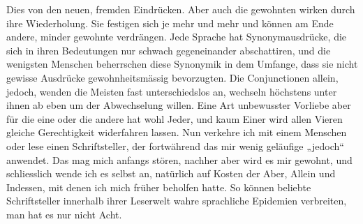 {Dies von den neuen, fremden Eindrücken. Aber auch die gewohnten wirken durch ihre Wiederholung. Sie festigen sich je mehr und mehr und können am Ende andere, minder gewohnte verdrängen. Jede Sprache hat Synonymausdrücke, die sich in ihren Bedeutungen nur schwach gegeneinander abschattiren, und die wenigsten Menschen beherrschen diese Synonymik in dem Umfange, dass sie nicht gewisse Ausdrücke gewohnheitsmässig bevorzugten. Die Conjunctionen  allein, jedoch,  wenden die Meisten fast unterschiedslos an, wechseln höchstens unter ihnen ab eben um der Abwechselung willen. Eine Art unbewusster Vorliebe aber für die eine oder die andere hat wohl Jeder, und kaum Einer wird allen Vieren gleiche Gerechtigkeit widerfahren lassen. Nun verkehre ich mit einem Menschen oder lese einen Schriftsteller, der fortwährend das mir wenig geläufige „jedoch“ anwendet. Das mag mich anfangs stören, nachher aber wird es mir gewohnt, und schliesslich wende ich es selbst an, natürlich auf Kosten der Aber, Allein und Indessen, mit denen ich mich früher beholfen hatte. So können beliebte Schriftsteller innerhalb ihrer Leserwelt wahre sprachliche Epidemien verbreiten, man hat es nur nicht Acht.


}
